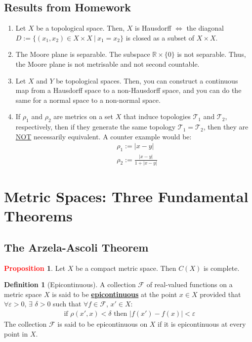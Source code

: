 \documentclass[11pt]{article}
\newcommand{\topo}[0]{\mathcal{T}}
\theoremstyle{definition}
\theoremstyle{definition}
\newcommand{\R}[0]{\mathbb{R}}
\newcommand{\dfn}[1]{\underline{\textbf{#1}}}
\theoremstyle{definition}
\newtheorem{definition}{\textcolor{OliveGreen}{Definition}}
\newtheorem{prop}{\textcolor{red}{Proposition}}
\theoremstyle{remark}
\begin{document}
\subsection{Results from Homework}
\begin{enumerate}[noitemsep]
	\item Let $X$ be a topological space. Then, $X$ is Hausdorff $\iff$ the diagonal $D:= \{ (x_1, x_2) \in X \times X\ |\ x_1 = x_2 \}$ is closed as a subset of $X \times X$. 
	\item The Moore plane is separable. The subspace $\R \times \{ 0 \}$ is not separable. Thus, the Moore plane is not metrisable and not second countable. 
	\item Let $X$ and $Y$ be topological spaces. Then, you can construct a continuous map from a Hausdorff space to a non-Hausdorff space, and you can do the same for a normal space to a non-normal space.
	\item If $\rho_1$ and $\rho_2$ are metrics on a set $X$ that induce topologies $\topo_1$ and $\topo_2$, respectively, then if they generate the same topology $\topo_1 = \topo_2$, then they are \underline{NOT} necessarily equivalent. A counter example would be: 
	\begin{align*}
		& \rho_1 := |x-y| \\
		& \rho_2 := \frac{|x-y|}{1 + |x-y|}
	\end{align*} 
\end{enumerate}

\section{Metric Spaces: Three Fundamental Theorems}

\subsection{The Arzela-Ascoli Theorem}

\begin{prop}
	Let $X$ be a compact metric space. Then $C(X)$ is complete. 
\end{prop}

\begin{definition}[Epicontinuous] 
	A collection $\mathcal{F}$ of real-valued functions on a metric space $X$ is said to be \dfn{epicontinuous} at the point $x \in X$ provided that $\forall \varepsilon >0$, $\exists$ $\delta >0$ such that $\forall f \in \mathcal{F}$, $x' \in X$: 
	\begin{align*}
		\text{ if } \rho (x', x) < \delta \text{ then } | f(x') - f(x) | < \varepsilon
	\end{align*}
	The collection $\mathcal{F}$ is said to be epicontinuous on $X$ if it is epicontinuous at every point in $X$. 
\end{definition}
\end{document}
